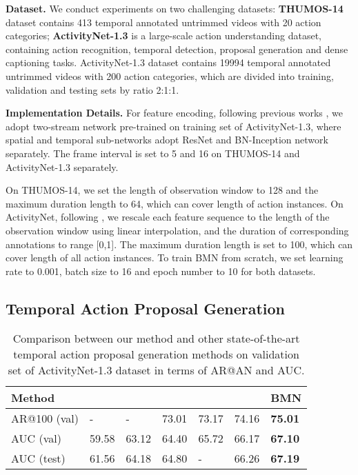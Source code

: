 \documentclass[10pt,twocolumn,letterpaper]{article}
\begin{document}
\noindent
\textbf{Dataset.}
We conduct experiments on two challenging datasets: {\bf THUMOS-14} \cite{jiang2014thumos} dataset contains 413 temporal annotated untrimmed videos with 20 action categories;  {\bf ActivityNet-1.3} \cite{caba2015activitynet}  is a large-scale action understanding dataset, containing action recognition, temporal detection, proposal generation and dense captioning tasks. ActivityNet-1.3 dataset contains 19994 temporal annotated untrimmed videos with 200 action categories, which are divided into training, validation and testing sets by ratio 2:1:1.

\noindent
{\bf Implementation Details.}
For feature encoding, following previous works \cite{lin2018bsn,gao2017turn}, we adopt two-stream network \cite{xiong2016cuhk} pre-trained on training set of ActivityNet-1.3, where spatial and temporal sub-networks adopt ResNet and BN-Inception network separately.
The frame interval  is set  to 5 and 16 on THUMOS-14 and ActivityNet-1.3 separately.

On THUMOS-14, we set the length of observation window  to 128 and the maximum duration length  to 64, which can cover length of  action instances.
On ActivityNet, following \cite{lin2018bsn,lin2017temporal}, we rescale each feature sequence to the length of the observation window  using linear interpolation, and the duration of corresponding annotations to range [0,1]. The maximum duration length  is set to 100, which can cover length of all action instances.
To train BMN from scratch, we set learning rate to 0.001, batch size to 16 and epoch number to 10 for both datasets.



\subsection{Temporal Action Proposal Generation}


\begin{table}[tbp]
\centering
\caption{ Comparison between our method and other state-of-the-art temporal action proposal generation methods on validation set of  ActivityNet-1.3 dataset in terms of AR@AN and AUC. }
\small
\begin{tabular}{m{1.9cm}m{0.55cm}<{\centering}m{0.55cm}<{\centering}m{0.55cm}<{\centering}m{0.55cm}<{\centering}m{0.55cm}<{\centering}m{0.55cm}<{\centering}}
\toprule
Method  &  \cite{dai2017temporal}   &  \cite{ghanem2017activitynet} & \cite{lin2017temporal}  & \cite{gao2018ctap} &  \cite{lin2018bsn} & BMN \\
\hline 
AR@100 (val)	& -		& - 	& 73.01	& 73.17 & 74.16 & {\bf 75.01}  \\
AUC (val) 		& 59.58 & 63.12 & 64.40 & 65.72	& 66.17 & {\bf 67.10} \\
AUC (test) 		& 61.56	& 64.18 & 64.80 & - 	& 66.26 & {\bf 67.19}  \\
\bottomrule
\end{tabular}
\label{table:proposal_anet}
\end{table}
\end{document}

